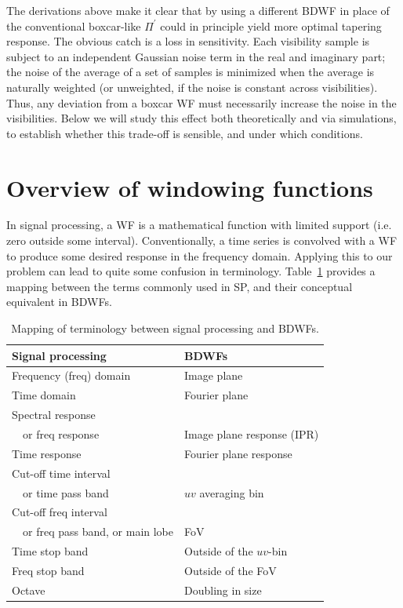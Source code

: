 \documentclass[useAMS,usenatbib]{mn2e}
\begin{document}
The derivations above make it clear that by using a different BDWF in place of the conventional boxcar-like $\Pi^\prime$ 
could in principle yield more optimal tapering response. The obvious catch is a loss in 
sensitivity. Each visibility sample is subject to an independent Gaussian noise term in the real and imaginary part; the noise of
the average of a set of samples is minimized when the average is naturally weighted (or unweighted, if the noise is 
constant across visibilities). Thus, any deviation from a boxcar WF must necessarily increase the noise in the 
visibilities. Below we will study this effect both theoretically and via simulations, to establish whether this 
trade-off is sensible, and under which conditions.

\section{Overview of windowing functions}
\label{subsec:Windowing functions}

In signal processing, a WF is a mathematical function with limited support (i.e. zero outside some interval). Conventionally,
a time series is convolved with a WF to produce some desired response in the frequency domain. Applying this to our problem
can lead to quite some confusion in terminology. Table~\ref{tab:terms} provides a mapping between the terms commonly used in SP, 
and their conceptual equivalent in BDWFs.

\begin{table}
\begin{tabular}{l|l}
 Signal processing & BDWFs\\
\hline\hline
Frequency (freq) domain & Image plane \\
Time domain & Fourier plane \\
Spectral response\\
~~or freq response & Image plane response (IPR)\\
Time response & Fourier plane response\\
Cut-off time interval  \\
~~or time pass band & $uv$ averaging bin\\
Cut-off freq interval \\
~~or freq pass band, or main lobe & FoV\\
Time stop band & Outside of the $uv$-bin\\
Freq stop band & Outside of the FoV\\
Octave & Doubling in size
\end{tabular}
\caption{Mapping of terminology between signal processing and BDWFs.}
\label{tab:terms}
\end{table}
\end{document}
